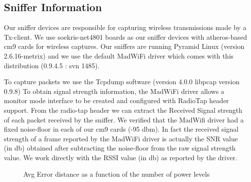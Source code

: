 \documentclass{Localization-PaperWriteupDraft}
\begin{document}
\subsection{Sniffer Information}
\label{subsec:snifferinformation}

Our sniffer devices are responsible for capturing wireless transmissions made by a Tx-client. We use soekris-net4801 boards as our sniffer
devices with atheros-based cm9 cards for wireless captures. Our sniffers are running Pyramid Linux (version 2.6.16-metrix) and we use the default
MadWiFi driver which comes with this distribution (0.9.4.5 : svn 1485). 

To capture packets we use the Tcpdump software (version 4.0.0 libpcap version 0.9.8) To obtain signal strength information, the MadWiFi driver allows a
monitor mode interface to be created and configured with RadioTap header support. From the radio-tap header we can extract the
Received Signal strength of each packet received by the sniffer. We verified that the MadWifi driver had a fixed noise-floor in each of our
cm9 cards (-95 dbm). In fact the received signal strength of a frame reported by the MadWiFi driver is actually the SNR value (in db) obtained after subtracting the noise-floor from the raw signal strength value. We work directly with the RSSI value (in db) as reported by the driver.

\begin{figure}
	\centering
	\caption{Avg Error distance as a function of the number of power levels}
	\label{fig:powerlevelsvserrordistance}
\end{figure}
\end{document}
